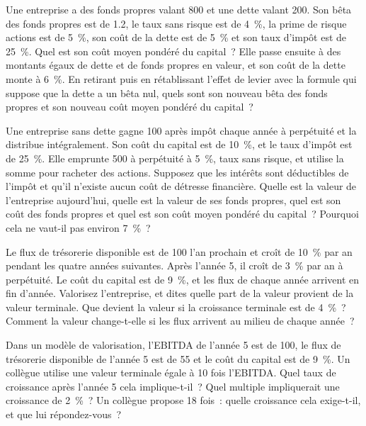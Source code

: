 \begin{question}\label{iq:iv2:valuation-and-financial-statements:8}
Une entreprise a des fonds propres valant 800 et une dette valant 200. Son bêta des fonds propres est de 1.2, le taux sans risque est de 4~\%, la prime de risque actions est de 5~\%, son coût de la dette est de 5~\% et son taux d'impôt est de 25~\%. Quel est son coût moyen pondéré du capital~? Elle passe ensuite à des montants égaux de dette et de fonds propres en valeur, et son coût de la dette monte à 6~\%. En retirant puis en rétablissant l'effet de levier avec la formule qui suppose que la dette a un bêta nul, quels sont son nouveau bêta des fonds propres et son nouveau coût moyen pondéré du capital~?
\end{question}

\begin{question}\label{iq:iv2:valuation-and-financial-statements:9}
Une entreprise sans dette gagne 100 après impôt chaque année à perpétuité et la distribue intégralement. Son coût du capital est de 10~\%, et le taux d'impôt est de 25~\%. Elle emprunte 500 à perpétuité à 5~\%, taux sans risque, et utilise la somme pour racheter des actions. Supposez que les intérêts sont déductibles de l'impôt et qu'il n'existe aucun coût de détresse financière. Quelle est la valeur de l'entreprise aujourd'hui, quelle est la valeur de ses fonds propres, quel est son coût des fonds propres et quel est son coût moyen pondéré du capital~? Pourquoi cela ne vaut-il pas environ 7~\%~?
\end{question}

\begin{question}\label{iq:iv2:valuation-and-financial-statements:10}
Le flux de trésorerie disponible est de 100 l'an prochain et croît de 10~\% par an pendant les quatre années suivantes. Après l'année 5, il croît de 3~\% par an à perpétuité. Le coût du capital est de 9~\%, et les flux de chaque année arrivent en fin d'année. Valorisez l'entreprise, et dites quelle part de la valeur provient de la valeur terminale. Que devient la valeur si la croissance terminale est de 4~\%~? Comment la valeur change-t-elle si les flux arrivent au milieu de chaque année~?
\end{question}

\begin{question}\label{iq:iv2:valuation-and-financial-statements:11}
Dans un modèle de valorisation, l'EBITDA de l'année 5 est de 100, le flux de trésorerie disponible de l'année 5 est de 55 et le coût du capital est de 9~\%. Un collègue utilise une valeur terminale égale à 10 fois l'EBITDA. Quel taux de croissance après l'année 5 cela implique-t-il~? Quel multiple impliquerait une croissance de 2~\%~? Un collègue propose 18 fois~: quelle croissance cela exige-t-il, et que lui répondez-vous~?
\end{question}

